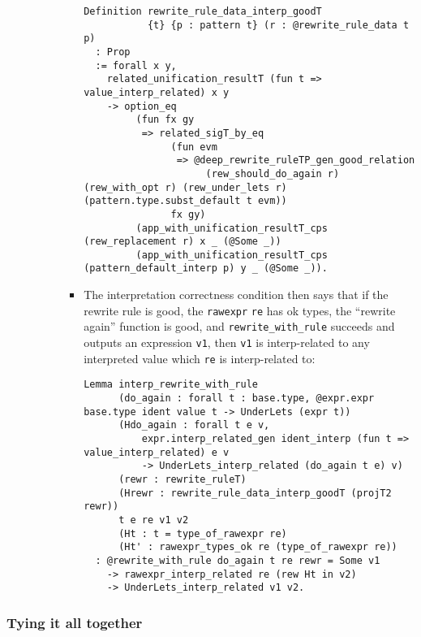 \begin{itemize}
\begin{itemize}
\begin{itemize}
\begin{itemize}
\begin{verbatim}
Definition rewrite_rule_data_interp_goodT
           {t} {p : pattern t} (r : @rewrite_rule_data t p)
  : Prop
  := forall x y,
    related_unification_resultT (fun t => value_interp_related) x y
    -> option_eq
         (fun fx gy
          => related_sigT_by_eq
               (fun evm
                => @deep_rewrite_ruleTP_gen_good_relation
                     (rew_should_do_again r) (rew_with_opt r) (rew_under_lets r) (pattern.type.subst_default t evm))
               fx gy)
         (app_with_unification_resultT_cps (rew_replacement r) x _ (@Some _))
         (app_with_unification_resultT_cps (pattern_default_interp p) y _ (@Some _)).
\end{verbatim}
      \item
        The interpretation correctness condition then says that if the
        rewrite rule is good, the \texttt{rawexpr} \texttt{re} has ok
        types, the ``rewrite again'' function is good, and
        \texttt{rewrite\_with\_rule} succeeds and outputs an expression
        \texttt{v1}, then \texttt{v1} is interp-related to any
        interpreted value which \texttt{re} is interp-related to:

\begin{verbatim}
Lemma interp_rewrite_with_rule
      (do_again : forall t : base.type, @expr.expr base.type ident value t -> UnderLets (expr t))
      (Hdo_again : forall t e v,
          expr.interp_related_gen ident_interp (fun t => value_interp_related) e v
          -> UnderLets_interp_related (do_again t e) v)
      (rewr : rewrite_ruleT)
      (Hrewr : rewrite_rule_data_interp_goodT (projT2 rewr))
      t e re v1 v2
      (Ht : t = type_of_rawexpr re)
      (Ht' : rawexpr_types_ok re (type_of_rawexpr re))
  : @rewrite_with_rule do_again t re rewr = Some v1
    -> rawexpr_interp_related re (rew Ht in v2)
    -> UnderLets_interp_related v1 v2.
\end{verbatim}
      \end{itemize}
    \end{itemize}
  \end{itemize}
\end{itemize}

\hypertarget{tying-it-all-together}{%
\subsubsection{Tying it all together}\label{tying-it-all-together}}


